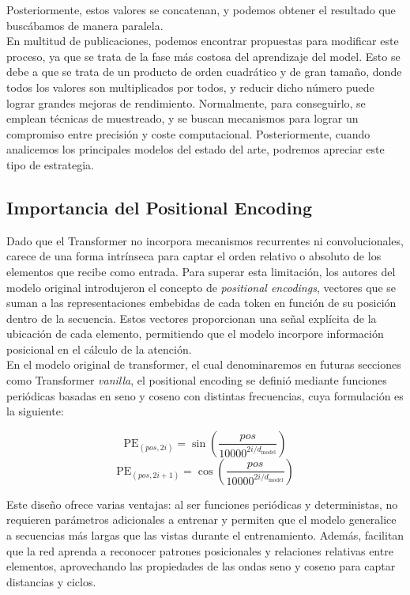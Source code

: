 Posteriormente, estos valores se concatenan, y podemos obtener el resultado que buscábamos de manera paralela.\\

En multitud de publicaciones, podemos encontrar propuestas para modificar este proceso, ya que se trata de la fase más costosa del aprendizaje del model. Esto se debe a que se trata de un producto de orden cuadrático y de gran tamaño, donde todos los valores son multiplicados por todos, y reducir dicho número puede lograr grandes mejoras de rendimiento. Normalmente, para conseguirlo, se emplean técnicas de muestreado, y se buscan mecanismos para lograr un compromiso entre precisión y coste computacional. Posteriormente, cuando analicemos los principales modelos del estado del arte, podremos apreciar este tipo de estrategia.

\subsection{Importancia del Positional Encoding}
\label{encodingsect}

Dado que el Transformer no incorpora mecanismos recurrentes ni convolucionales, carece de una forma intrínseca para captar el orden relativo o absoluto de los elementos que recibe como entrada. Para superar esta limitación, los autores del modelo original introdujeron el concepto de \textit{positional encodings}, vectores que se suman a las representaciones embebidas de cada token en función de su posición dentro de la secuencia. Estos vectores proporcionan una señal explícita de la ubicación de cada elemento, permitiendo que el modelo incorpore información posicional en el cálculo de la atención.\\

En el modelo original de transformer, el cual denominaremos en futuras secciones como Transformer \textit{vanilla}, el positional encoding se definió mediante funciones periódicas basadas en seno y coseno con distintas frecuencias, cuya formulación es la siguiente:

\begin{equation}
    \text{PE}_{(pos, 2i)} = \sin\left( \frac{pos}{10000^{2i/d_{\text{model}}}} \right)
\end{equation}
\begin{equation}
    \text{PE}_{(pos, 2i+1)} = \cos\left( \frac{pos}{10000^{2i/d_{\text{model}}}} \right)
\end{equation}

Este diseño ofrece varias ventajas: al ser funciones periódicas y deterministas, no requieren parámetros adicionales a entrenar y permiten que el modelo generalice a secuencias más largas que las vistas durante el entrenamiento. Además, facilitan que la red aprenda a reconocer patrones posicionales y relaciones relativas entre elementos, aprovechando las propiedades de las ondas seno y coseno para captar distancias y ciclos.\\

